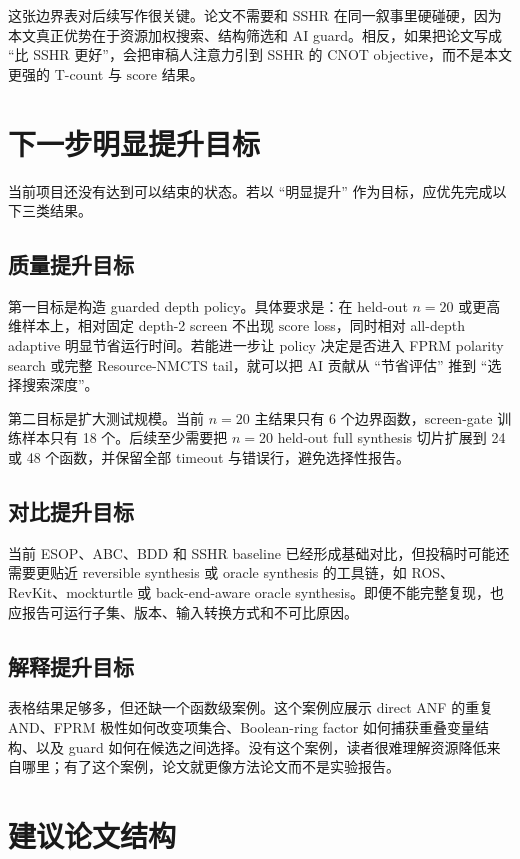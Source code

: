 \documentclass[UTF8,fontset=macnew,11pt]{ctexart}
\newcommand{\method}{Resource-NMCTS}
\newcommand{\score}{\ensuremath{\mathrm{score}}}
\begin{document}
这张边界表对后续写作很关键。论文不需要和 SSHR 在同一叙事里硬碰硬，因为本文真正优势在于资源加权搜索、结构筛选和 AI guard。相反，如果把论文写成 ``比 SSHR 更好''，会把审稿人注意力引到 SSHR 的 CNOT objective，而不是本文更强的 T-count 与 \score{} 结果。

\section{下一步明显提升目标}

当前项目还没有达到可以结束的状态。若以 ``明显提升'' 作为目标，应优先完成以下三类结果。

\subsection{质量提升目标}

第一目标是构造 guarded depth policy。具体要求是：在 held-out $n=20$ 或更高维样本上，相对固定 depth-2 screen 不出现 \score{} loss，同时相对 all-depth adaptive 明显节省运行时间。若能进一步让 policy 决定是否进入 FPRM polarity search 或完整 \method{} tail，就可以把 AI 贡献从 ``节省评估'' 推到 ``选择搜索深度''。

第二目标是扩大测试规模。当前 $n=20$ 主结果只有 6 个边界函数，screen-gate 训练样本只有 18 个。后续至少需要把 $n=20$ held-out full synthesis 切片扩展到 24 或 48 个函数，并保留全部 timeout 与错误行，避免选择性报告。

\subsection{对比提升目标}

当前 ESOP、ABC、BDD 和 SSHR baseline 已经形成基础对比，但投稿时可能还需要更贴近 reversible synthesis 或 oracle synthesis 的工具链，如 ROS、RevKit、mockturtle 或 back-end-aware oracle synthesis。即便不能完整复现，也应报告可运行子集、版本、输入转换方式和不可比原因。

\subsection{解释提升目标}

表格结果足够多，但还缺一个函数级案例。这个案例应展示 direct ANF 的重复 AND、FPRM 极性如何改变项集合、Boolean-ring factor 如何捕获重叠变量结构、以及 guard 如何在候选之间选择。没有这个案例，读者很难理解资源降低来自哪里；有了这个案例，论文就更像方法论文而不是实验报告。

\section{建议论文结构}
\end{document}
